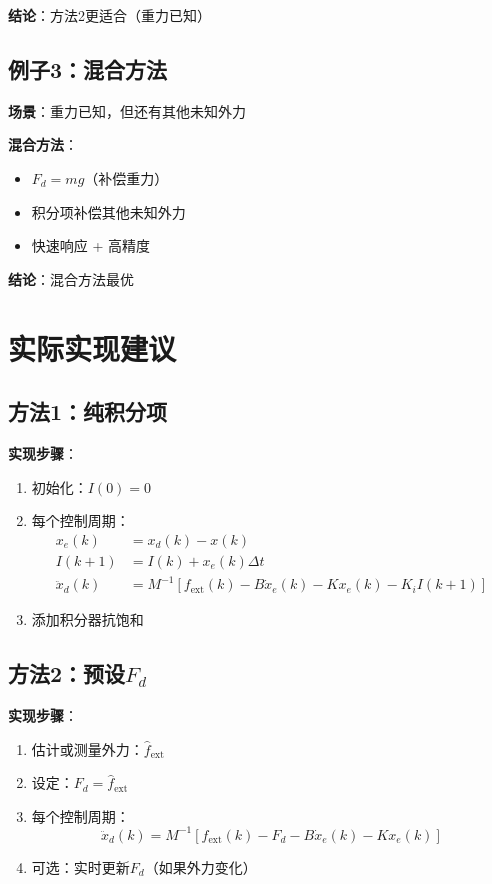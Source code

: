 \documentclass[12pt,a4paper]{article}
\begin{document}
\textbf{结论}：方法2更适合（重力已知）

\subsection{例子3：混合方法}

\textbf{场景}：重力已知，但还有其他未知外力

\textbf{混合方法}：
\begin{itemize}
\item $F_d = mg$（补偿重力）
\item 积分项补偿其他未知外力
\item 快速响应 + 高精度
\end{itemize}

\textbf{结论}：混合方法最优

\section{实际实现建议}

\subsection{方法1：纯积分项}

\textbf{实现步骤}：
\begin{enumerate}
\item 初始化：$I(0) = 0$
\item 每个控制周期：
\begin{align}
x_e(k) &= x_d(k) - x(k) \\
I(k+1) &= I(k) + x_e(k) \Delta t \\
\ddot{x}_d(k) &= M^{-1}[f_{\text{ext}}(k) - B\dot{x}_e(k) - Kx_e(k) - K_i I(k+1)]
\end{align}
\item 添加积分器抗饱和
\end{enumerate}

\subsection{方法2：预设$F_d$}

\textbf{实现步骤}：
\begin{enumerate}
\item 估计或测量外力：$\hat{f}_{\text{ext}}$
\item 设定：$F_d = \hat{f}_{\text{ext}}$
\item 每个控制周期：
\begin{equation}
\ddot{x}_d(k) = M^{-1}[f_{\text{ext}}(k) - F_d - B\dot{x}_e(k) - Kx_e(k)]
\end{equation}
\item 可选：实时更新$F_d$（如果外力变化）
\end{enumerate}
\end{document}
